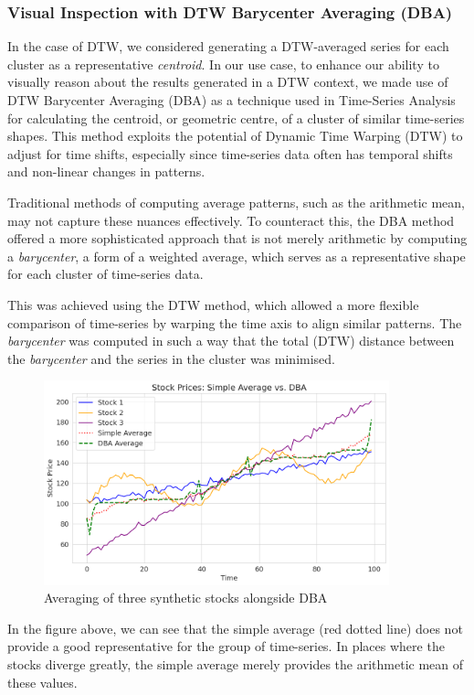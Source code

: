 \documentclass[11pt]{article}
\begin{document}
\subsubsection{Visual Inspection with DTW Barycenter Averaging (DBA)}

In the case of DTW, we considered generating a DTW-averaged series for each cluster as a representative \textit{centroid}. In our use case, to enhance our ability to visually reason about the results generated in a DTW context, we made use of DTW Barycenter Averaging (DBA) as a technique used in Time-Series Analysis for calculating the centroid, or geometric centre, of a cluster of similar time-series shapes. This method exploits the potential of Dynamic Time Warping (DTW) to adjust for time shifts, especially since time-series data often has temporal shifts and non-linear changes in patterns. 

Traditional methods of computing average patterns, such as the arithmetic mean, may not capture these nuances effectively. To counteract this, the DBA method offered a more sophisticated approach that is not merely arithmetic by computing a \textit{barycenter}, a form of a weighted average, which serves as a representative shape for each cluster of time-series data.

This was achieved using the DTW method, which allowed a more flexible comparison of time-series by warping the time axis to align similar patterns. The \textit{barycenter} was computed in such a way that the total (DTW) distance between the \textit{barycenter} and the series in the cluster was minimised.

\begin{figure}[H] 
\centering
\includegraphics[width=10cm]{img/average-vs-dba.png} 
\caption{Averaging of three synthetic stocks alongside DBA}
\label{fig:average-vs-dba}
\end{figure}

In the figure above, we can see that the simple average (red dotted line) does not provide a good representative for the group of time-series. In places where the stocks diverge greatly, the simple average merely provides the arithmetic mean of these values.
\end{document}
